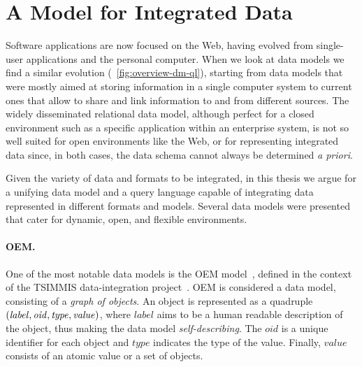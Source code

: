 \section{A Model for Integrated Data}
\label{sec:model-integr-data}


Software applications are now focused on the Web, having evolved from single-user applications and the personal
computer.
%
When we look at data models we find a similar evolution (\cf~\cref{fig:overview-dm-ql}), starting from data models
that were mostly aimed at storing information in a single computer system to current ones that allow to share and link
information to and from different sources.
%
The widely disseminated relational data model, although perfect for a closed environment such as a specific application
within an enterprise system, is not so well suited for open environments like the Web, or for representing integrated
data since, in both cases, the data schema cannot always be determined \textit{a priori}.
%

Given the variety of data and formats to be integrated, in this thesis we argue for a unifying data model and a query
language capable of integrating data represented in different formats and models.
%
Several \sd data models were presented that cater for dynamic, open, and flexible environments.
%
\paragraph*{OEM.}
One of the most notable \sd data models is the \acf{OEM} model~\cite{PapakonstantinouGarcia-MolinaWidom:1995aa}, defined
in the context of the TSIMMIS data-integration project~\cite{Garcia-MolinaPapakonstantinouQuass:1997aa}.  \ac{OEM} is
considered a \sd data model, consisting of a \emph{graph of objects}.  An object is represented as a
quadruple~$(\mathit{label}, \mathit{oid}, \mathit{type}, \mathit{value})$, where $\mathit{label}$ aims to be a
human readable description of the object, thus making the data model \emph{self-describing}.
% 
The $\mathit{oid}$ is a unique identifier for each object and $\mathit{type}$ indicates the type of the value.  Finally,
$\mathit{value}$ consists of an atomic value or a set of objects.

